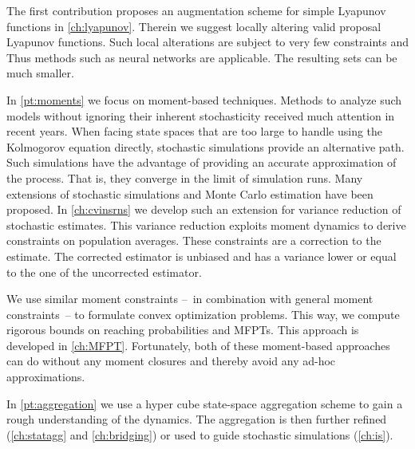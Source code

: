 The first contribution proposes an augmentation scheme for simple Lyapunov functions in \autoref{ch:lyapunov}.
Therein we suggest locally altering valid proposal Lyapunov functions.
Such local alterations are subject to very few constraints and
Thus methods such as neural networks are applicable.
The resulting sets can be much smaller.

In \autoref{pt:moments} we focus on moment-based techniques.
Methods to analyze such models without ignoring their inherent stochasticity received much attention in recent years.
When facing state spaces that are too large to handle using the Kolmogorov equation directly, stochastic simulations \parencite{gillespie1977exact} provide an alternative path.
Such simulations have the advantage of providing an accurate approximation of the process.
That is, they converge in the limit of simulation runs.
Many extensions of stochastic simulations and Monte Carlo estimation have been proposed.
In \autoref{ch:cvinsrns} we develop such an extension for variance reduction of stochastic estimates.
This variance reduction exploits moment dynamics to derive constraints on population averages.
These constraints are a correction to the estimate.
The corrected estimator is unbiased and has a variance lower or equal to the one of the uncorrected estimator.

We use similar moment constraints  --~in combination with general moment constraints~-- to formulate convex optimization problems.
This way, we compute rigorous bounds on reaching probabilities and \aclp{MFPT}.
This approach is developed in \autoref{ch:MFPT}.
Fortunately, both of these moment-based approaches can do without any moment closures
and thereby avoid any ad-hoc approximations.

In \autoref{pt:aggregation} we use a hyper cube state-space aggregation scheme to gain a rough understanding of the dynamics.
The aggregation is then further refined (\autoref{ch:statagg} and \autoref{ch:bridging}) or used to guide stochastic simulations (\autoref{ch:is}).

